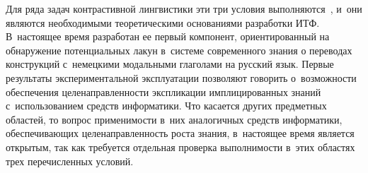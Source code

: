 \begin{multicols}{2}
  Для ряда задач контрастивной лингвистики эти три условия 
выполняются~\cite{17-zat, 18-zat}, и~они являются необходимыми 
тео\-ре\-ти\-че\-ски\-ми основаниями разработки ИТФ. В~настоящее время разработан 
ее первый компонент, ориентированный на обнаружение потенциальных лакун в~сис\-те\-ме современного знания о переводах конструкций с~немецкими 
модальными глаголами на русский язык. Первые результаты 
экспериментальной эксплуатации позволяют говорить о~воз\-мож\-ности 
обеспечения целенаправленности экспликации имплицированных знаний 
с~использованием средств информатики. Что касается других предметных 
областей, то вопрос применимости в~них аналогичных средств информатики, 
обеспечивающих целенаправленность роста знания, в~на\-сто\-ящее время 
является открытым, так как требуется отдельная проверка вы\-пол\-ни\-мости в~этих 
областях трех перечисленных условий.
  

\end{multicols}
